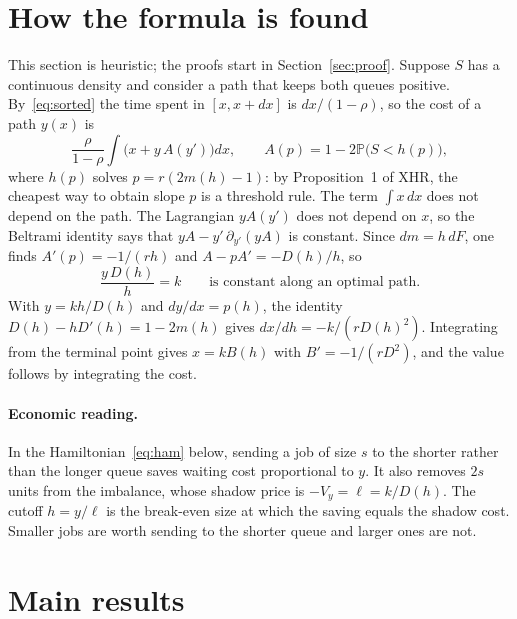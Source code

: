 \documentclass[11pt]{article}
\numberwithin{equation}{section}
\theoremstyle{definition}
\theoremstyle{remark}
\newcommand{\Prob}{\mathbb{P}}
\begin{document}
\section{How the formula is found}\label{sec:heuristic}

This section is heuristic; the proofs start in Section~\ref{sec:proof}. Suppose $S$ has a continuous density and consider a path that keeps both queues positive. By~\eqref{eq:sorted} the time spent in $[x,x+dx]$ is $dx/(1-\rho)$, so the cost of a path $y(x)$ is
\[
\frac{\rho}{1-\rho}\int\bigl(x+y\,A(y')\bigr)dx,\qquad A(p)=1-2\Prob\bigl(S<h(p)\bigr),
\]
where $h(p)$ solves $p=r(2m(h)-1)$: by Proposition~1 of XHR, the cheapest way to obtain slope $p$ is a threshold rule. The term $\int x\,dx$ does not depend on the path. The Lagrangian $yA(y')$ does not depend on $x$, so the Beltrami identity says that $yA-y'\,\partial_{y'}(yA)$ is constant. Since $dm=h\,dF$, one finds $A'(p)=-1/(rh)$ and $A-pA'=-D(h)/h$, so
\begin{equation}\label{eq:beltrami}
\frac{y\,D(h)}{h}=k\qquad\text{is constant along an optimal path.}
\end{equation}
With $y=kh/D(h)$ and $dy/dx=p(h)$, the identity $D(h)-hD'(h)=1-2m(h)$ gives $dx/dh=-k/(rD(h)^2)$. Integrating from the terminal point gives $x=kB(h)$ with $B'=-1/(rD^2)$, and the value follows by integrating the cost.

\paragraph{Economic reading.} In the Hamiltonian~\eqref{eq:ham} below, sending a job of size $s$ to the shorter rather than the longer queue saves waiting cost proportional to $y$. It also removes $2s$ units from the imbalance, whose shadow price is $-V_y=\ell=k/D(h)$. The cutoff $h=y/\ell$ is the break-even size at which the saving equals the shadow cost. Smaller jobs are worth sending to the shorter queue and larger ones are not.

\section{Main results}\label{sec:results}
\end{document}
